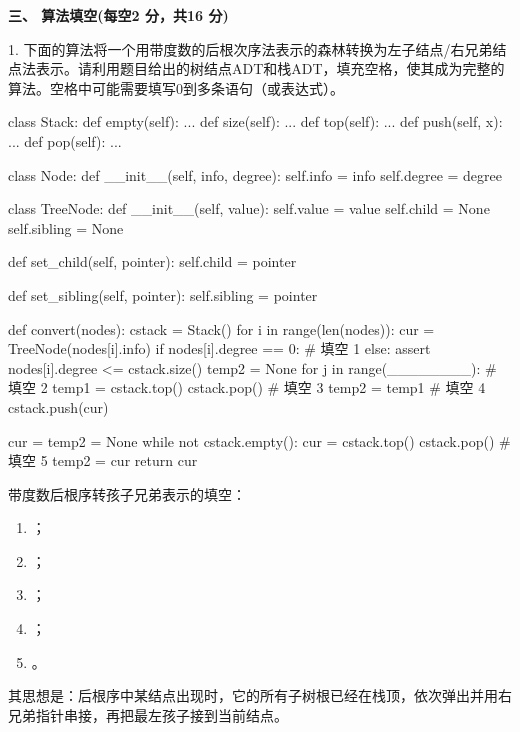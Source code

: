 \textbf{三、 算法填空(每空2 分，共16 分)}
\begin{question}
1. 下面的算法将一个用带度数的后根次序法表示的森林转换为左子结点/右兄弟结点法表示。请利用题目给出的树结点ADT和栈ADT，填充空格，使其成为完整的算法。空格中可能需要填写0到多条语句（或表达式）。
\begin{pycode}
class Stack:
    def empty(self): ...
    def size(self): ...
    def top(self): ...
    def push(self, x): ...
    def pop(self): ...


class Node:
    def __init__(self, info, degree):
        self.info = info
        self.degree = degree


class TreeNode:
    def __init__(self, value):
        self.value = value
        self.child = None
        self.sibling = None

    def set_child(self, pointer):
        self.child = pointer

    def set_sibling(self, pointer):
        self.sibling = pointer


def convert(nodes):
    cstack = Stack()
    for i in range(len(nodes)):
        cur = TreeNode(nodes[i].info)
        if nodes[i].degree == 0:
            # 填空 1
        else:
            assert nodes[i].degree <= cstack.size()
            temp2 = None
            for j in range(________):      # 填空 2
                temp1 = cstack.top()
                cstack.pop()
                # 填空 3
                temp2 = temp1
            # 填空 4
            cstack.push(cur)

    cur = temp2 = None
    while not cstack.empty():
        cur = cstack.top()
        cstack.pop()
        # 填空 5
        temp2 = cur
    return cur
\end{pycode}
\begin{solution}
带度数后根序转孩子兄弟表示的填空：
  \begin{enumerate}[leftmargin=2em]
    \item \texttt{}；
    \item \texttt{}；
    \item \texttt{}；
    \item \texttt{}；
    \item \texttt{}。
  \end{enumerate}
  其思想是：后根序中某结点出现时，它的所有子树根已经在栈顶，依次弹出并用右兄弟指针串接，再把最左孩子接到当前结点。
\end{solution}
\end{question}

